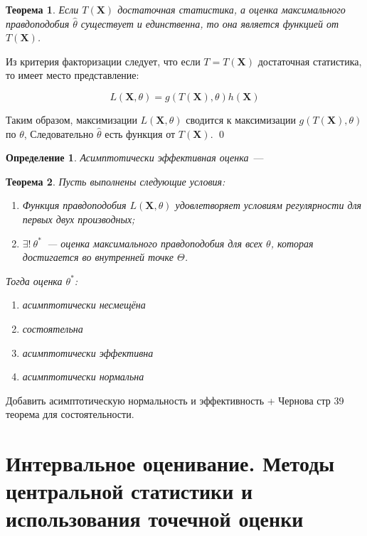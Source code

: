 \documentclass[oneside,final,14pt]{extreport}
\renewenvironment{proof}{{\bfseries Доказательство.}}{\qed}
\newtheorem{thm}{Теорема}[section]
\theoremstyle{definition}
\newtheorem{defn}{Определение}[section]
\begin{document}
\begin{thm}
Если $T(\mathbf{X})$ достаточная статистика, а оценка максимального правдоподобия $\hat{\theta}$ существует и единственна, то она является функцией от $T(\mathbf{X})$.
\end{thm}

\begin{proof}
Из критерия факторизации следует, что если $T=T(\mathbf{X})$ достаточная статистика, то имеет место представление:

\begin{equation*}
    L(\mathbf{X}, \theta)=g(T(\mathbf{X}), \theta) h(\mathbf{X})
\end{equation*}

Таким образом, максимизации $L(\mathbf{X},\theta)$ сводится к максимизации $g(T(\mathbf{X}), \theta)$ по $\theta$, Следовательно $\hat{\theta}$ есть функция от $T(\mathbf{X})$.
\end{proof}

\begin{defn}
    {\it Асимптотически эффективная оценка}~---
\end{defn}

\begin{thm}
    Пусть выполнены следующие условия:
    \begin{enumerate}
        \item Функция правдоподобия $L(\mathbf{X}, \theta)$ удовлетворяет условиям регулярности для первых двух производных;
        \item $\exists!~ \theta^{*}$~--- оценка максимального правдоподобия для всех $\theta$, которая достигается во внутренней точке $\Theta$.
    \end{enumerate}
    Тогда оценка $\theta^{*}$:
    \begin{enumerate}
        \item асимптотически несмещёна
        \item состоятельна
        \item асимптотически эффективна
        \item асимптотически нормальна
    \end{enumerate}
\end{thm}

Добавить асимптотическую нормальность и эффективность + Чернова стр 39 теорема для состоятельности.

\section{Интервальное оценивание. Методы центральной статистики и использования точечной оценки}
\end{document}

